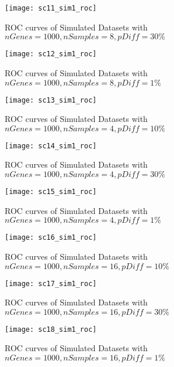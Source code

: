 \begin{figure}[h!tb] 
\texttt{[image: sc11\_sim1\_roc]}
\caption{ROC curves of Simulated Datasets with $nGenes=1000, nSamples=8, pDiff=30\%$}
\label{sc11_roc}
\end{figure}

\begin{figure}[h!tb] 
\texttt{[image: sc12\_sim1\_roc]}
\caption{ROC curves of Simulated Datasets with $nGenes=1000, nSamples=8, pDiff=1\%$}
\label{sc12_roc}
\end{figure}


\begin{figure}[h!tb] 
\texttt{[image: sc13\_sim1\_roc]}
\caption{ROC curves of Simulated Datasets with $nGenes=1000, nSamples=4, pDiff=10\%$}
\label{sc13_roc}
\end{figure}


\begin{figure}[h!tb] 
\texttt{[image: sc14\_sim1\_roc]}
\caption{ROC curves of Simulated Datasets with $nGenes=1000, nSamples=4, pDiff=30\%$}
\label{sc14_roc}
\end{figure}


\begin{figure}[h!tb] 
\texttt{[image: sc15\_sim1\_roc]}
\caption{ROC curves of Simulated Datasets with $nGenes=1000, nSamples=4, pDiff=1\%$}
\label{sc15_roc}
\end{figure}

\begin{figure}[h!tb] 
\texttt{[image: sc16\_sim1\_roc]}
\caption{ROC curves of Simulated Datasets with $nGenes=1000, nSamples=16, pDiff=10\%$}
\label{sc16_roc}
\end{figure}

\begin{figure}[h!tb] 
\texttt{[image: sc17\_sim1\_roc]}
\caption{ROC curves of Simulated Datasets with $nGenes=1000, nSamples=16, pDiff=30\%$}
\label{sc17_roc}
\end{figure}

\begin{figure}[h!tb] 
\texttt{[image: sc18\_sim1\_roc]}
\caption{ROC curves of Simulated Datasets with $nGenes=1000, nSamples=16, pDiff=1\%$}
\label{sc18_roc}
\end{figure}
